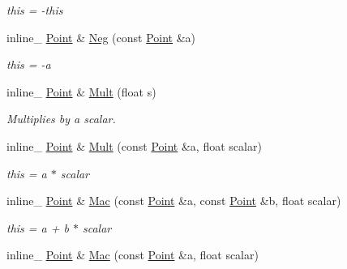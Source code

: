 \begin{DoxyCompactItemize}
\begin{DoxyCompactList}\small\item\em this = -\/this \end{DoxyCompactList}\item 
\hypertarget{class_point_acf9cfb48a2151bf50990a7d47f5035d0}{inline\+\_\+ \hyperlink{class_point}{Point} \& \hyperlink{class_point_acf9cfb48a2151bf50990a7d47f5035d0}{Neg} (const \hyperlink{class_point}{Point} \&a)}\label{class_point_acf9cfb48a2151bf50990a7d47f5035d0}

\begin{DoxyCompactList}\small\item\em this = -\/a \end{DoxyCompactList}\item 
\hypertarget{class_point_a5e0e11455fc386e3243932bebee1b0a5}{inline\+\_\+ \hyperlink{class_point}{Point} \& \hyperlink{class_point_a5e0e11455fc386e3243932bebee1b0a5}{Mult} (float s)}\label{class_point_a5e0e11455fc386e3243932bebee1b0a5}

\begin{DoxyCompactList}\small\item\em Multiplies by a scalar. \end{DoxyCompactList}\item 
\hypertarget{class_point_a00050920c3249f183de3b16d8fb6868b}{inline\+\_\+ \hyperlink{class_point}{Point} \& \hyperlink{class_point_a00050920c3249f183de3b16d8fb6868b}{Mult} (const \hyperlink{class_point}{Point} \&a, float scalar)}\label{class_point_a00050920c3249f183de3b16d8fb6868b}

\begin{DoxyCompactList}\small\item\em this = a $\ast$ scalar \end{DoxyCompactList}\item 
\hypertarget{class_point_aa7487bbb1b8865004be202b1d6e1dbe5}{inline\+\_\+ \hyperlink{class_point}{Point} \& \hyperlink{class_point_aa7487bbb1b8865004be202b1d6e1dbe5}{Mac} (const \hyperlink{class_point}{Point} \&a, const \hyperlink{class_point}{Point} \&b, float scalar)}\label{class_point_aa7487bbb1b8865004be202b1d6e1dbe5}

\begin{DoxyCompactList}\small\item\em this = a + b $\ast$ scalar \end{DoxyCompactList}\item 
\hypertarget{class_point_ae3e119e45894e04d9424ae3bcf250102}{inline\+\_\+ \hyperlink{class_point}{Point} \& \hyperlink{class_point_ae3e119e45894e04d9424ae3bcf250102}{Mac} (const \hyperlink{class_point}{Point} \&a, float scalar)}\label{class_point_ae3e119e45894e04d9424ae3bcf250102}


\end{DoxyCompactItemize}
